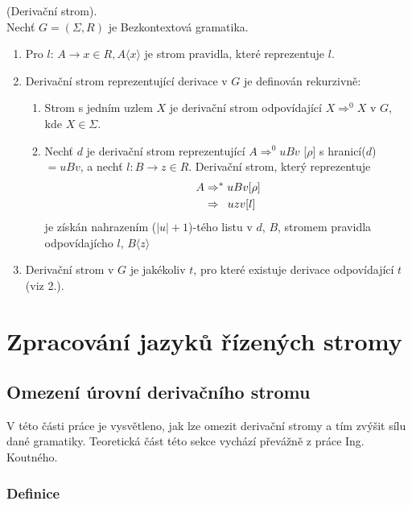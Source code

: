 \begin{defn}
  (Derivační strom). \cite[str. 92]{MedunaIFJ}\\
  Nechť $G = (\Sigma, R)$ je Bezkontextová gramatika.\\
  \begin{enumerate}
    \item Pro $l$: $A \rightarrow x \in R, A\langle x\rangle$ je strom pravidla, které reprezentuje $l$.
    \item Derivační strom reprezentující derivace v $G$ je definován rekurzivně:
    \begin{enumerate}
      \item Strom s jedním uzlem $X$ je derivační strom odpovídající $X \Rightarrow^0 X$ v $G$, kde $X \in \Sigma$.
      \item Nechť $d$ je derivační strom reprezentující
            $A \Rightarrow^0 uBv$ [$\rho$] s hranicí($d$) $ = uBv$, a nechť $l: B \rightarrow z \in R$.
            Derivační strom, který reprezentuje
            \begin{align}
                A & \Rightarrow^* uBv [\rho] \nonumber\\
                  & \Rightarrow \hphantom{*} uzv [l] \nonumber
            \end{align}
            je získán nahrazením ($|u|+1$)-tého listu v $d$, $B$, stromem pravidla odpovídajícho $l$, $B\langle z\rangle$
    \end{enumerate}
    \item Derivační strom v $G$ je jakékoliv $t$, pro které existuje derivace odpovídající $t$ (viz 2.).
  \end{enumerate}
\end{defn}

\chapter{Zpracování jazyků řízených stromy}

\section{Omezení úrovní derivačního stromu}

V této části práce je vysvětleno, jak lze omezit derivační stromy a tím zvýšit
sílu dané gramatiky.
Teoretická část této sekce vychází převážně z práce Ing. Koutného\cite{Koutny}.\\

\subsection{Definice}

